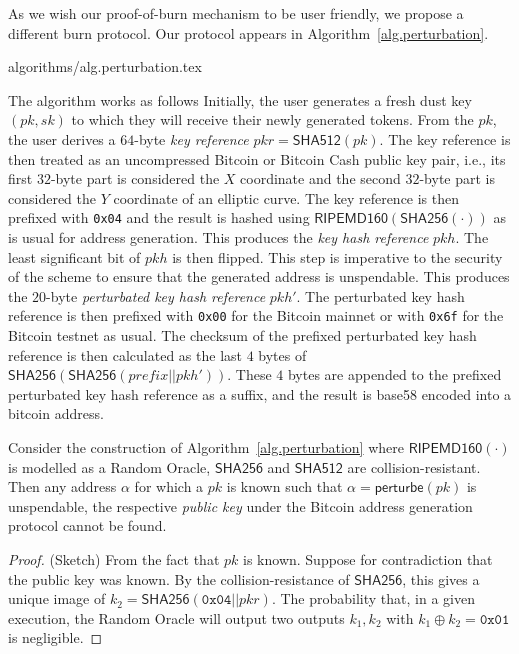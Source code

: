 As we wish our proof-of-burn mechanism to be user friendly, we propose a
different burn protocol. Our protocol appears in
Algorithm~\ref{alg.perturbation}.

{algorithms/alg.perturbation.tex}

The algorithm works as follows Initially, the user generates a fresh dust key
$(pk, sk)$ to which they will receive their newly generated tokens.  From the $pk$, the user derives a $64$-byte
\emph{key reference} $pkr = \textsf{SHA512}(pk)$. The key reference is then
treated as an uncompressed Bitcoin or Bitcoin Cash public key pair, i.e., its
first $32$-byte part is considered the $X$ coordinate and the second $32$-byte
part is considered the $Y$ coordinate of an elliptic curve. The key reference is
then prefixed with \texttt{0x04} and the result is hashed using
$\textsf{RIPEMD160}(\textsf{SHA256}(\cdot))$ as is usual for address generation.
This produces the \emph{key hash reference} $pkh$. The least significant bit of
$pkh$ is then flipped. This step is imperative to the security of the scheme to
ensure that the generated address is unspendable. This produces the $20$-byte
\emph{perturbated key hash reference} $pkh'$. The perturbated key hash reference
is then prefixed with \texttt{0x00} for the Bitcoin mainnet or with
\texttt{0x6f} for the Bitcoin testnet as usual. The checksum of the prefixed
perturbated key hash reference is then calculated as the last $4$ bytes of
$\textsf{SHA256}(\textsf{SHA256}(prefix || pkh'))$. These $4$ bytes are appended
to the prefixed perturbated key hash reference as a suffix, and the result is
\textsf{base58} encoded into a bitcoin address.

\begin{lemma}[Unspendability]
  Consider the construction of Algorithm~\ref{alg.perturbation} where
  $\textsf{RIPEMD160}(\cdot)$ is modelled as a Random Oracle, $\textsf{SHA256}$
  and $\textsf{SHA512}$  are collision-resistant. Then any address $\alpha$ for
  which a $pk$ is known such that $\alpha = \textsf{perturbe}(pk)$ is
  unspendable, the respective \emph{public key} under the Bitcoin address
  generation protocol cannot be found.
\end{lemma}
\begin{proof}(Sketch)
  From the fact that $pk$ is known.
  Suppose for contradiction that the public key was known.
  By the collision-resistance of $\textsf{SHA256}$, this gives a unique image of
  $k_2 = \textsf{SHA256}(\texttt{0x04} || pkr)$.
  The probability that, in a given execution, the Random Oracle will output two
  outputs $k_1, k_2$ with $k_1 \oplus k_2 = \texttt{0x01}$ is negligible.
\end{proof}

